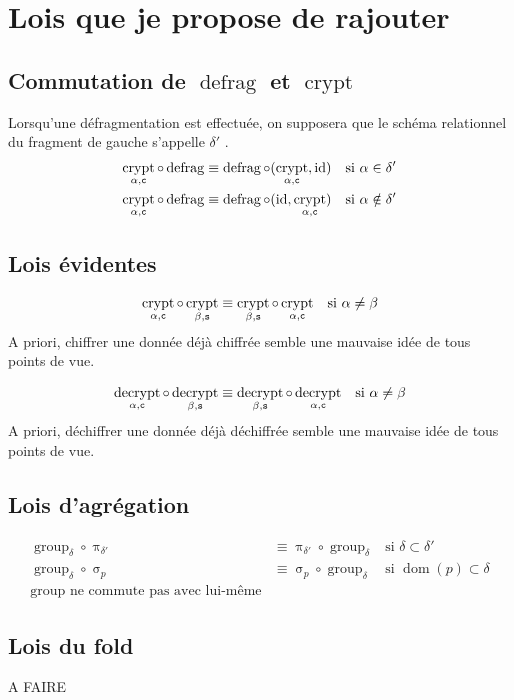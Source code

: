 \documentclass[french]{article}
\DeclareMathOperator{\proj}{\pi}
\DeclareMathOperator{\sel}{\sigma}
\DeclareMathOperator{\defrag}{defrag}
\DeclareMathOperator{\crypt}{crypt}
\DeclareMathOperator{\decrypt}{decrypt}
\DeclareMathOperator{\group}{group}
\DeclareMathOperator{\id}{id}
\DeclareMathOperator{\dom}{dom}
\newcommand\typeT[1]{\text{\ttfamily #1}}
\newcommand{\decryptArgs}[2]{\decrypt_{#1 , \typeT{#2}}}
\newcommand{\cryptArgs}[2]{\crypt_{#1 , \typeT{#2}}}
\newcommand{\selP}{\sel_p}
\newcommand{\decryptCAlpha}{\decryptArgs{\alpha}{c}}
\newcommand{\cryptCAlpha}{\cryptArgs{\alpha}{c}}
\newcommand{\groupDelta}{\group_{\delta}}
\begin{document}
\section*{Lois que je propose de rajouter}
\subsection*{Commutation de $\defrag$ et $\crypt$}
Lorsqu'une défragmentation est effectuée, on supposera que le schéma relationnel
du fragment de gauche s'appelle $\delta'$ .
\begin{align}
\cryptCAlpha \circ \defrag 
& \equiv \defrag \circ (\cryptCAlpha, \id)
& \text{si $\alpha \in \delta'$} \\
\cryptCAlpha \circ \defrag 
& \equiv \defrag \circ (\id, \cryptCAlpha)
& \text{si $\alpha \notin \delta'$} 
\end{align}

\subsection*{Lois évidentes}
\begin{align}
\cryptCAlpha \circ \cryptArgs{\beta}{s}
& \equiv \cryptArgs{\beta}{s} \circ \cryptCAlpha
& \text{si $\alpha \neq \beta$}
\end{align}
A priori, chiffrer une donnée déjà chiffrée semble une mauvaise idée de tous points de vue.

\begin{align}
\decryptCAlpha \circ \decryptArgs{\beta}{s}
& \equiv \decryptArgs{\beta}{s} \circ \decryptCAlpha
& \text{si $\alpha \neq \beta$}
\end{align}
A priori, déchiffrer une donnée déjà déchiffrée semble une mauvaise idée de tous points de vue.

\subsection*{Lois d'agrégation}
\begin{align}
\groupDelta \circ \proj_{\delta'}
& \equiv \proj_{\delta'} \circ \groupDelta
& \text{si $\delta \subset \delta'$} \\
\groupDelta \circ \selP 
& \equiv \selP \circ \groupDelta
& \text{si $\dom(p) \subset \delta$} \\
\text{$\group$ ne commute pas avec lui-même}
\end{align}

\subsection*{Lois du fold}
A FAIRE
\end{document}
